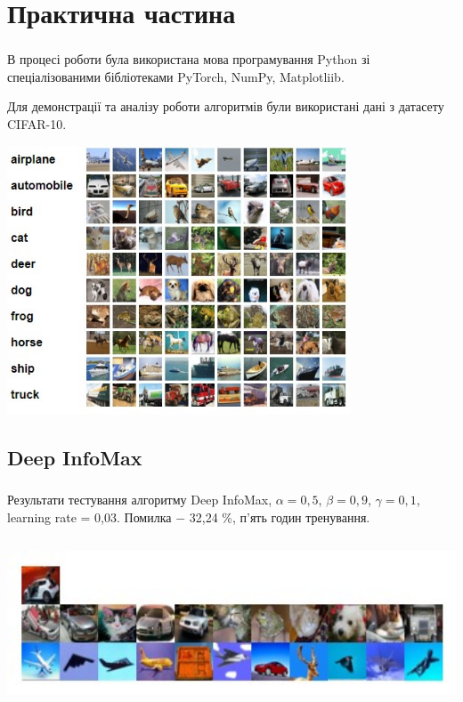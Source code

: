 \documentclass[c]{beamer}
\begin{document}
\section{Практична частина}

\begin{frame}
	\frametitle{\insertsection}
	
	В процесі роботи була використана мова програмування Python зі спеціалізованими бібліотеками PyTorch, NumPy, Matplotliib.\pause
	
	
	Для демонстрації та аналізу роботи алгоритмів були використані дані з датасету CIFAR-10.


  	\includegraphics[width=\textwidth, height=8cm, natwidth=471, natheight=370]{cifar10.jpg}

\end{frame}

\subsection{Deep InfoMax}

\begin{frame}
	\frametitle{\insertsection}
	\framesubtitle{\insertsubsection}

	Результати тестування алгоритму Deep InfoMax, $\alpha = 0,5$, $\beta = 0,9$, $\gamma = 0,1$, learning rate = 0,03. Помилка $-$ 32,24 \%, п'ять годин тренування.
		
    \includegraphics[width=\textwidth, height=5cm, natwidth=375, natheight=121]{deepinfodemo3.jpg}


\end{frame}
\end{document}
